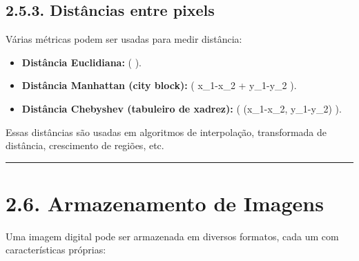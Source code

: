 \documentclass[
  portuguese,
  letterpaper,
  openany,
  oneside,
  12pt,
  a4paper]{book}
\providecommand{\tightlist}{%
  \setlength{\itemsep}{0pt}\setlength{\parskip}{0pt}}
\begin{document}
\begin{tcolorbox}
\subsection{2.5.3. Distâncias entre
pixels}\label{distuxe2ncias-entre-pixels}

Várias métricas podem ser usadas para medir distância:

\begin{itemize}
\tightlist
\item
  \textbf{Distância Euclidiana:} (  ).
\item
  \textbf{Distância Manhattan (city block):} (
  \textbar x\_1-x\_2\textbar{} + \textbar y\_1-y\_2\textbar{} ).
\item
  \textbf{Distância Chebyshev (tabuleiro de xadrez):} (
  \max(\textbar x\_1-x\_2\textbar, \textbar y\_1-y\_2\textbar) ).
\end{itemize}

Essas distâncias são usadas em algoritmos de interpolação, transformada
de distância, crescimento de regiões, etc.

\begin{center}\rule{0.5\linewidth}{0.5pt}\end{center}

\section{2.6. Armazenamento de Imagens}\label{armazenamento-de-imagens}

Uma imagem digital pode ser armazenada em diversos formatos, cada um com
características próprias:


\end{tcolorbox}
\end{document}
